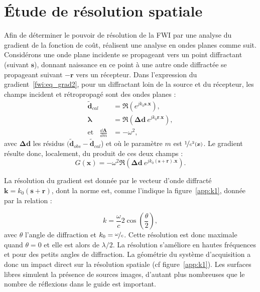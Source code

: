 

\section{Étude de résolution spatiale \label{app:section_reso}}

Afin de déterminer le pouvoir de résolution de la FWI par une analyse du gradient de la fonction de coût, \cite{sirgue} réalisent une analyse en ondes planes comme suit. Considérons une onde plane incidente se propageant vers un point diffractant (suivant $\bm{s}$), donnant naissance en ce point à une autre onde diffractée se propageant suivant $-\bm{r}$ vers un récepteur. Dans l'expression du gradient~\ref{fwi:eq_grad2}, pour un diffractant loin de la source et du récepteur, les champs incident et rétropropagé sont des ondes planes : 
\begin{align}
	\bm{\tilde{d}}_{cal} &= \Re{(e^{jk_{0}\bm{s}.\bm{x}})},\\
	\bm{\lambda} &= \Re{(\bm{\Delta d}~e^{jk_{0}\bm{r}.\bm{x}})},\\
	\text{et}~~~~\frac{\dd \bm{A}}{\dd m} &= -\omega^2,
\end{align}
avec $ \bm{\Delta d}$ les résidus $(\bm{\tilde{d}}_{obs}-\bm{\tilde{d}}_{cal}$) et où le paramètre $m$ est $\nicefrac{1}{c^2(\bm{x})}$. Le gradient résulte donc, localement, du produit de ces deux champs : 
\begin{equation}
	G(\bm{x})=-\omega^2 \Re(\bm{\Delta d}~e^{jk_{0}(\bm{s}+\bm{r}).\bm{x}}).
\end{equation} 


La résolution du gradient est donnée par le vecteur d'onde diffracté $\bm{k}=k_{0}(\bm{s}+\bm{r})$, dont la norme est, comme l'indique la figure~\ref{app:k1}, donnée par la relation :

\begin{equation}
	k= \frac{\omega}{c} 2 \cos\left( \frac{\theta}{2}\right),
	\label{app:nb_onde}
\end{equation}
avec $\theta$ l'angle de diffraction et $k_{0}=\nicefrac{\omega}{c}$.
Cette résolution est donc maximale quand $\theta=0$ et elle est alors de $\lambda/2$. La résolution s'améliore en hautes fréquences et pour des petits angles de diffraction. La géométrie du système d'acquisition a donc un impact direct sur la résolution spatiale (cf figure~\ref{app:k1}). Les surfaces libres simulent la présence de sources images, d'autant plus nombreuses que le nombre de réflexions dans le guide est important. \\


